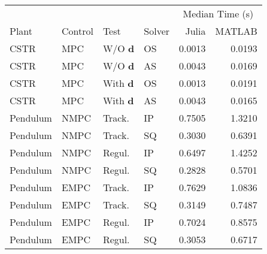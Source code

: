 \begin{tabular}{llllrr}
	
\toprule %

	  &	& & & \multicolumn{2}{c}{Median Time (s)} \\ \cmidrule(l){5-6}
Plant & Control & Test & Solver & Julia & MATLAB \\
\midrule %

CSTR		& MPC	& W/O $\mathbf{d}$	& OS & \num{0.0013} & \num{0.0193}	\\
CSTR		& MPC	& W/O $\mathbf{d}$	& AS & \num{0.0043} & \num{0.0169}	\\
CSTR		& MPC	& With $\mathbf{d}$ & OS & \num{0.0013} & \num{0.0191}	\\
CSTR		& MPC	& With $\mathbf{d}$ & AS & \num{0.0043} & \num{0.0165}	\\
Pendulum 	& NMPC	& Track. 	   		& IP & \num{0.7505} & \num{1.3210}	\\
Pendulum 	& NMPC	& Track. 	   		& SQ & \num{0.3030} & \num{0.6391}	\\
Pendulum    & NMPC	& Regul. 			& IP & \num{0.6497} & \num{1.4252} 	\\
Pendulum    & NMPC	& Regul. 			& SQ & \num{0.2828} & \num{0.5701} 	\\
Pendulum    & EMPC	& Track.			& IP & \num{0.7629} & \num{1.0836} 	\\
Pendulum    & EMPC	& Track.			& SQ & \num{0.3149} & \num{0.7487} 	\\
Pendulum	& EMPC	& Regul. 			& IP & \num{0.7024} & \num{0.8575} 	\\
Pendulum	& EMPC	& Regul. 			& SQ & \num{0.3053} & \num{0.6717}  \\
	
\bottomrule %
	
\end{tabular}